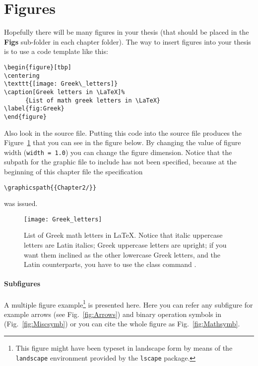 \section{Figures}\label{section 2.4}

Hopefully there will be many figures in your thesis (that should be placed in the \textbf{Figs} sub-folder in each chapter folder). The way to insert figures into your thesis is to use a code template like this:
\begin{verbatim}
\begin{figure}[tbp] 
\centering    
\texttt{[image: Greek\_letters]}
\caption[Greek letters in \LaTeX]%
      {List of math greek letters in \LaTeX}
\label{fig:Greek}
\end{figure}
\end{verbatim}
Also look in the source file. Putting this code into the source file produces the Figure~\ref{fig:Greek} that you can see in the figure below. By changing the value of figure width (\texttt{width = 1.0\string\textwidth}) you can change the figure dimension. Notice that the subpath for the graphic file to include has not been specified, because at the beginning of this chapter file the specification
\begin{verbatim}
\graphicspath{{Chapter2/}}
\end{verbatim}
was issued.

\begin{figure}[tbp] 
\centering    
\texttt{[image: Greek\_letters]}
\caption[Greek letters in \LaTeX]{List of Greek math letters in \LaTeX. Notice that italic uppercase letters are Latin italics; Greek uppercase letters are upright; if you want them inclined as the other lowercase Greek letters, and the Latin counterparts, you have to use the class command \texttt{\string\DeclareSlantedCapitalGreekLetters}.}
\label{fig:Greek}
\end{figure}



\paragraph{Subfigures}
A multiple figure example\footnote{This figure might have been typeset in landscape form by means of the \texttt{landscape} environment provided by the \texttt{lscape} package.} 
is presented here. Here you can refer any subfigure for example  arrows (see Fig.~\ref{fig:Arrows}) and binary operation symbols in (Fig.~\ref{fig:Miscsymb}) or you can cite the whole figure as Fig.~\ref{fig:Mathsymb}.

